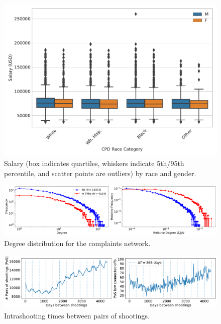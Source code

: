 \begin{figure}[t!] 
	\includegraphics[width=\textwidth]{figs/salary_by_race_gender} 
	\caption{Salary (box indicates quartiles, whiskers indicate 5th/95th percentile, and scatter points are outliers) by race and gender.} \label{fig:salary_gender_race}
\end{figure}


\begin{figure}[t!] 
	\includegraphics[width=\textwidth]{figs/degree_distribution} 
	\caption{Degree distribution for the complaints network.}
\label{fig:degree_distribution}
\end{figure}

\begin{figure}[t!] 
	\includegraphics[width=\textwidth]{figs/intrashooting_times} 
	\caption{Intrashooting times between pairs of shootings.}
\label{fig:intrashooting_time}
\end{figure}




